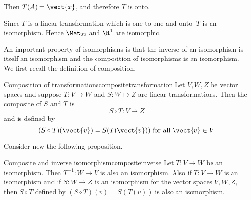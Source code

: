\begin{solution}
Then $T(A)=\vect{x}$, and therefore $T$ is onto.

Since $T$ is a linear transformation which is one-to-one and onto, $T$ is an isomorphism. Hence $\Mat_{22}$ and $\R^4$ are isomorphic.
\end{solution}

An important property of isomorphisms is that the inverse of an isomorphism
is itself an isomorphism and the composition of isomorphisms is an
isomorphism. We first recall the definition of composition.

\begin{definition}{Composition of transformations}{compositetransformation}
Let $V, W, Z$ be vector spaces and suppose $T: V \mapsto W$ and $S: W \mapsto Z$ are linear transformations. Then the composite of $S$ and $T$ is
\[
S \circ T: V \mapsto Z
\]
and is defined by 
\[
(S \circ T) (\vect{v}) = S(T(\vect{v})) \mbox{ for all } \vect{v} \in V
\]
\end{definition}

Consider now the following proposition.

\begin{proposition}{Composite and inverse isomorphism}{compositeinverse}
Let $T:V\rightarrow W$ be an isomorphism. Then $T^{-1}:W\rightarrow V$ is
also an isomorphism. Also if $T:V\rightarrow W$ is an isomorphism and if $
S:W\rightarrow Z$ is an isomorphism for the vector spaces $V,W,Z,$ then $
S\circ T$ defined by $\left( S\circ T\right) \left( v\right) = S\left(
T\left( v\right) \right) $ is also an isomorphism.
\end{proposition}

